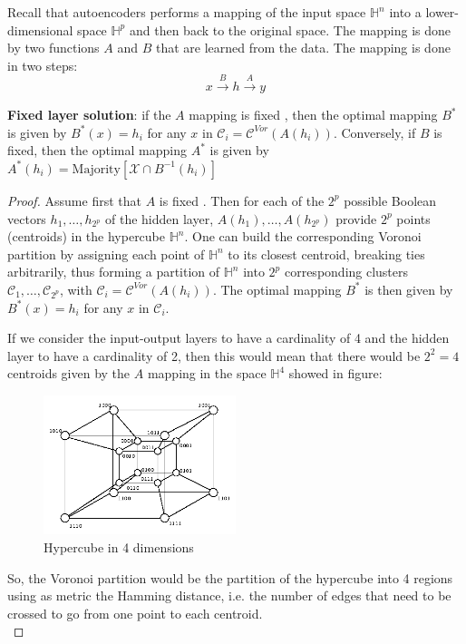 Recall that autoencoders performs a mapping of the input space $\mathbb{H}^n$ into a lower-dimensional space $\mathbb{H}^p$ and then back to the original space. The mapping is done by two functions $A$ and $B$ that are learned from the data. The mapping is done in two steps:
\[
    x \xrightarrow{B} h \xrightarrow{A} y
\]

\begin{theorem}
    \textbf{Fixed layer solution}: if the $A$ mapping is fixed , then the optimal mapping $B^*$ is given by $B^*(x) = h_i$ for any $x$ in $\mathcal{C}_i = \mathcal{C}^{Vor}(A(h_i))$. Conversely, if $B$ is fixed, then the optimal mapping $A^*$ is given by $A^*(h_i) = \text{Majority}\left[\mathcal{X} \cap B^{-1}(h_i)\right]$ 
\end{theorem}
\begin{proof}
    Assume first that $A$ is fixed . Then for each of the $2^p$ possible Boolean vectors $h_1, \dots, h_{2^{p}}$ of the hidden layer, $A(h_1), \dots, A(h_{2^p})$ provide $2^p$ points (centroids) in the hypercube $\mathbb{H}^n$. One can build the corresponding Voronoi partition by assigning each point of $\mathbb{H}^n$ to its closest centroid, breaking ties arbitrarily, thus forming a partition of $\mathbb{H}^n$ into $2^p$ corresponding clusters $\mathcal{C}_1, \dots, \mathcal{C}_{2^p}$, with $\mathcal{C}_i = \mathcal{C}^{Vor}(A(h_i))$. The optimal mapping $B^*$ is then given by $B^*(x) = h_i$ for any $x$ in $\mathcal{C}_i$.

    If we consider the input-output layers to have a cardinality of 4 and the hidden layer to have a cardinality of 2, then this would mean that there would be $2^2 = 4$ centroids given by the $A$ mapping in the space $\mathbb{H}^4$ showed in figure:

        \begin{figure}[H]
            \centering
            \includegraphics[width=0.5\textwidth]{./Images/Hypercube4Dimensions.png}
            \caption{Hypercube in 4 dimensions}
        \end{figure}
    So, the Voronoi partition would be the partition of the hypercube into 4 regions using as metric the Hamming distance, i.e. the number of edges that need to be crossed to go from one point to each centroid.\\


\end{proof}
